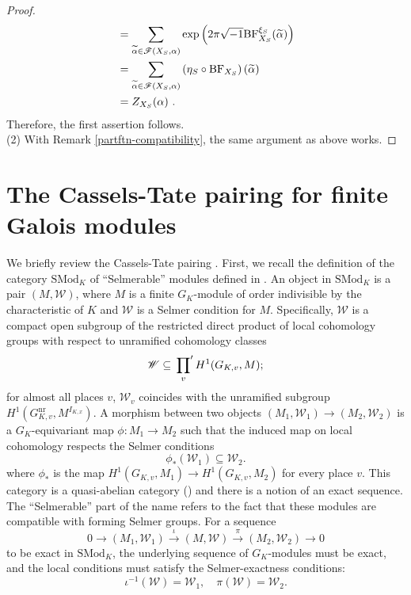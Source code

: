 \documentclass[a4paper]{amsart}
\theoremstyle{definition}
\numberwithin{equation}{section}
\begin{document}
\begin{proof}
\begin{align*}
    &=\sum_{\widetilde{\alpha}\in\mathscr{F}(X_S,\alpha)}\exp\left(2\pi\sqrt{-1}\mathrm{BF}_{X_S}^{\xi_S}(\widetilde{\alpha})\right)\\
    &=\sum_{\widetilde{\alpha}\in\mathscr{F}(X_S,\alpha)}\left(\eta_S\circ\mathrm{BF}_{X_S}\right)(\widetilde{\alpha})\\
    &=Z_{X_S}(\alpha)\rlap{\ .}
\end{align*}
Therefore, the first assertion follows.\\
\indent (2) With Remark \ref{partftn-compatibility}, the same argument as above works.
\end{proof}



\section{The Cassels-Tate pairing for finite Galois modules}
We briefly review the Cassels-Tate pairing \cite[Definition 2.2]{MS24}.
First, we recall the definition of the category $\mathrm{SMod}_K$ of ``Selmerable'' modules defined in \cite[section 2.2.1]{MS24}.
An object in $\mathrm{SMod}_K$ is a pair $(M, \mathscr{W})$, where $M$ is a finite $G_K$-module of order indivisible by the characteristic of $K$ and $\mathscr{W}$ is a Selmer condition for $M$. Specifically, $\mathscr{W}$ is a compact open subgroup of the restricted direct product of local cohomology groups with respect to unramified cohomology classes
$$\mathscr{W} \subseteq \sideset{}{'}\prod_{v} H^1(G_{K,v}, M);$$
for almost all places $v$, $\mathscr{W}_v$ coincides with the unramified subgroup 
$H^1(G_{K,v}^{\mathrm{nr}}, M^{I_{K,x}})$.
A morphism between two objects $(M_1, \mathscr{W}_1) \to (M_2, \mathscr{W}_2)$ is a $G_K$-equivariant map $\phi: M_1 \to M_2$ such that the induced map on local cohomology respects the Selmer conditions
$$\phi_*(\mathscr{W}_1) \subseteq \mathscr{W}_2.$$
where $\phi_*$ is the map $H^1(G_{K,v}, M_1) \to H^1(G_{K,v}, M_2)$ for every place $v$.
This category is a quasi-abelian category (\cite[Defintion 4.10]{MS21}) and there is a notion of an exact sequence. The ``Selmerable'' part of the name refers to the fact that these modules are compatible with forming Selmer groups. For a sequence
$$0 \to (M_1, \mathscr{W}_1) \xrightarrow{\iota} (M, \mathscr{W}) \xrightarrow{\pi} (M_2, \mathscr{W}_2) \to 0$$
to be exact in $\mathrm{SMod}_K$, the underlying sequence of $G_K$-modules must be exact, and the local conditions must satisfy the Selmer-exactness conditions:
$$\iota^{-1}(\mathscr{W}) = \mathscr{W}_1, \quad \pi(\mathscr{W}) = \mathscr{W}_2.$$
\end{document}
